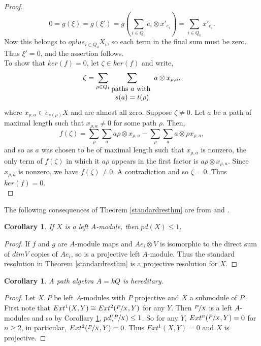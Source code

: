 \documentclass[11.5pt, twoside, a4paper, titlepage]{report}
\makeatletter
\theoremstyle{definition}
\theoremstyle{plain}
\newtheorem{cor}[mydef]{Corollary}
\newcommand{\mytab}[1]{%
\begin{tabular}{@{}c@{}}
#1
\end{tabular}
}
\makeatother
\begin{document}
\begin{proof}
\begin{equation*}
0=g(\xi)=g(\xi')=g(\sum_{i\in Q_0} e_i \otimes x'_{e_i})=\sum_{i \in Q_0} x'_{e_i}.
\end{equation*}
Now this belongs to $oplus_{i\in Q_0} X_i$, so each term in the final sum must be zero. Thus $\xi'=0$, and the assertion follows.\\
To show that $ker(f)=0$, let $\zeta\in ker(f)$ and write,
\begin{equation*}
\zeta = \sum_{\rho\in Q_1} \sum_{\mytab{\text{paths $a$ with }\\ $s(a)=t(\rho)$}} a\otimes x_{\rho,a},
\end{equation*}
where $x_{p,a} \in e_{s(\rho)}X$ and are almost all zero. Suppose $\zeta \neq 0$. Let $a$ be a path of maximal length such that $x_{\rho,a} \neq 0$ for some path $\rho$. Then,
\begin{equation*}
f(\zeta)=\sum_{\rho}\sum_a a\rho \otimes x_{\rho,a} - \sum_{\rho}\sum_a a \otimes \rho x_{\rho,a},
\end{equation*}
and so as $a$ was chosen to be of maximal length such that $x_{\rho,a}$ is nonzero, the only term of $f(\zeta)$ in which it $a\rho$ appears in the first factor is $a\rho \otimes x_{\rho,a}$. Since $x_{\rho,a}$ is nonzero, we have $f(\zeta)\neq 0$. A contradiction and so $\zeta=0$. Thus $ker(f)=0$.\\
\end{proof}

The following consequences of Theorem \ref{standardresthm} are from \cite{CB2} and \cite{Vale}.

\begin{cor} \label{pd1cor}
If $X$ is a left $A$-module, then $pd(X)\leq 1$.
\end{cor}
\begin{proof}
If $f$ and $g$ are $A$-module maps and $Ae_i \otimes V$ is isomorphic to the direct sum of $dimV$ copies of $Ae_i$, so is a projective left $A$-module. Thus the standard resolution in Theorem \ref{standardresthm} is a projective resolution for $X$.
\end{proof}

\begin{cor}
A path algebra $A=kQ$ is hereditary.
\end{cor}
\begin{proof}
Let $X,P$ be left $A$-modules with $P$ projective and $X$ a submodule of $P$. First note that $Ext^1(X,Y) \cong Ext^2(\sfrac{P}{X},Y)$ for any $Y$. Then $\sfrac{P}{X}$ is a left $A$-modules and so by Corollary \ref{pd1cor}, $pd(\sfrac{P}{X})\leq 1$. So for any $Y$, $Ext^n(\sfrac{P}{X},Y)=0$ for $n\geq 2$, in particular, $Ext^2(\sfrac{P}{X},Y)=0$. Thus $Ext^1(X,Y)=0$ and $X$ is projective.
\end{proof}
\end{document}
